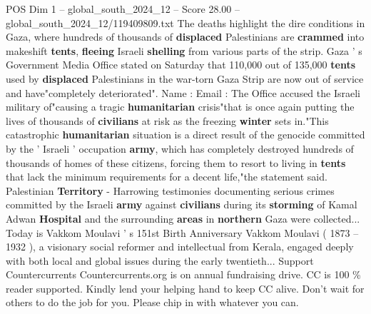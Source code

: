 \begin{textsample}{POS Dim 1 – global\_south\_2024\_12 – Score 28.00 – global\_south\_2024\_12/119409809.txt}
The deaths highlight the dire conditions in Gaza, where hundreds of thousands of \textbf{displaced} Palestinians are \textbf{crammed} into makeshift \textbf{tents}, \textbf{fleeing} Israeli \textbf{shelling} from various parts of the strip.
Gaza ' s Government Media Office stated on Saturday that 110,000 out of 135,000 \textbf{tents} used by \textbf{displaced} Palestinians in the war-torn Gaza Strip are now out of service and have"completely deteriorated".
Name : Email : The Office accused the Israeli military of"causing a tragic \textbf{humanitarian} crisis"that is once again putting the lives of thousands of \textbf{civilians} at risk as the freezing \textbf{winter} sets in."This catastrophic \textbf{humanitarian} situation is a direct result of the genocide committed by the ' Israeli ' occupation \textbf{army}, which has completely destroyed hundreds of thousands of homes of these citizens, forcing them to resort to living in \textbf{tents} that lack the minimum requirements for a decent life,"the statement said.
Palestinian \textbf{Territory} - Harrowing testimonies documenting serious crimes committed by the Israeli \textbf{army} against \textbf{civilians} during its \textbf{storming} of Kamal Adwan \textbf{Hospital} and the surrounding \textbf{areas} in \textbf{northern} Gaza were collected...
Today is Vakkom Moulavi ' s 151st Birth Anniversary Vakkom Moulavi ( 1873 -- 1932 ), a visionary social reformer and intellectual from Kerala, engaged deeply with both local and global issues during the early twentieth...
Support Countercurrents Countercurrents.org is on annual fundraising drive.
CC is 100 \% reader supported.
Kindly lend your helping hand to keep CC alive.
Don't wait for others to do the job for you.
Please chip in with whatever you can.

\end{textsample}
